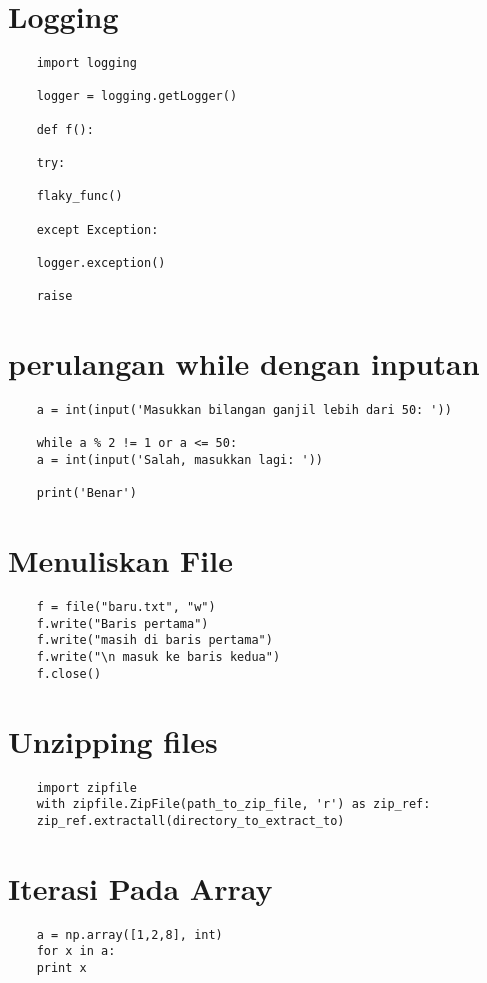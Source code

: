 \documentclass[12pt]{article} %
\begin{document}
\section {Logging}
\begin{lstlisting}
	import logging
	
	logger = logging.getLogger()
	
	def f():
	
	try:
	
	flaky_func()
	
	except Exception:
	
	logger.exception()
	
	raise
\end{lstlisting}

\section {perulangan while dengan inputan}
\begin{lstlisting}
	a = int(input('Masukkan bilangan ganjil lebih dari 50: '))
	
	while a % 2 != 1 or a <= 50:
	a = int(input('Salah, masukkan lagi: '))
	
	print('Benar')
\end{lstlisting}

\section {Menuliskan File}
\begin{lstlisting}
	f = file("baru.txt", "w")
	f.write("Baris pertama")
	f.write("masih di baris pertama")
	f.write("\n masuk ke baris kedua")
	f.close()
\end{lstlisting}

\section {Unzipping files}
\begin{lstlisting}
	import zipfile
	with zipfile.ZipFile(path_to_zip_file, 'r') as zip_ref:
	zip_ref.extractall(directory_to_extract_to)
\end{lstlisting}

\section {Iterasi Pada Array}
\begin{lstlisting}
	a = np.array([1,2,8], int)
	for x in a:
	print x
\end{lstlisting}
\end{document}

